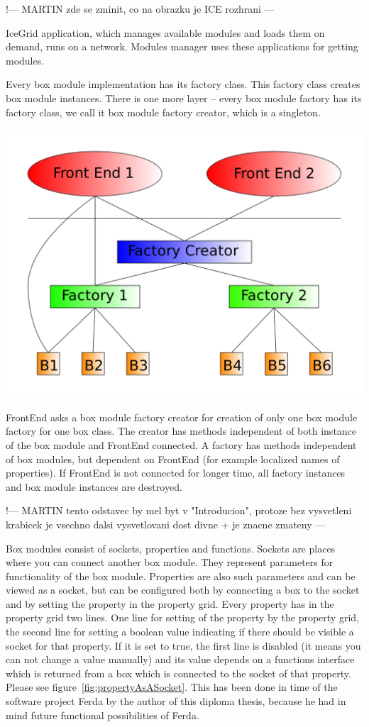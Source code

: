 \documentclass[a4paper,12pt]{book}
\begin{document}
!--- MARTIN zde se zminit, co na obrazku je ICE rozhrani ---

IceGrid application, which manages available modules and loads them on demand, runs on a network. Modules manager uses these applications for getting modules.

Every box module implementation has its factory class. This factory class creates box module instances. There is one more layer -- every box module factory has its factory class, we call it box module factory creator, which is a singleton.

\noindent\includegraphics[width=1\textwidth]{creatorFactory}

FrontEnd asks a box module factory creator for creation of only one box module factory for one box class. The creator has methods independent of both instance of the box module and FrontEnd connected. A factory has methods independent of box modules, but dependent on FrontEnd (for example localized names of properties). If FrontEnd is not connected for longer time, all factory instances and box module instances are destroyed.

!--- MARTIN tento odstavec by mel byt v "Introducion", protoze bez vysvetleni krabicek je vsechno dalsi vysvetlovani dost divne + je znacne zmateny ---

Box modules consist of sockets, properties and functions. Sockets are places where you can connect another box module. They represent parameters for functionality of the box module. Properties are also such parameters and can be viewed as a socket, but can be configured both by connecting a box to the socket and by setting the property in the property grid. Every property has in the property grid two lines. One line for setting of the property by the property grid, the second line for setting a boolean value indicating if there should be visible a socket for that property. If it is set to true, the first line is disabled (it means you can not change a value manually) and its value depends on a functions interface which is returned from a box which is connected to the socket of that property. Please see figure~\ref{fig:propertyAsASocket}. This has been done in time of the software project Ferda by the author of this diploma thesis, because he had in mind future functional possibilities of Ferda. 
\end{document}
